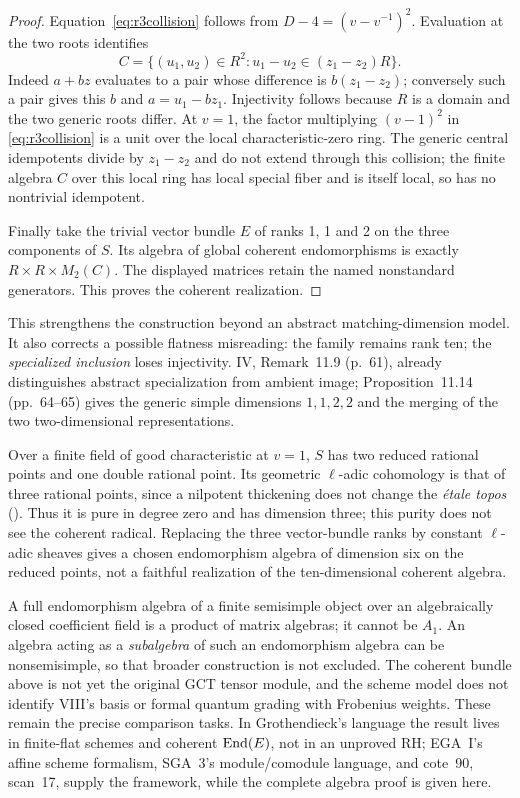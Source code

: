 \documentclass[11pt,a4paper]{article}
\theoremstyle{named}\newtheorem{finding}{Finding}[section]
\theoremstyle{definition}\newtheorem{definition}[finding]{Definition}
\theoremstyle{remark}\newtheorem{remark}[finding]{Remark}
\begin{document}
\begin{proof}
Equation~\eqref{eq:r3collision} follows from $D-4=(v-v^{-1})^2$. Evaluation at the two roots identifies
\[
 C=\{(u_1,u_2)\in R^2:u_1-u_2\in(z_1-z_2)R\}.
\]
Indeed $a+bz$ evaluates to a pair whose difference is $b(z_1-z_2)$; conversely such a pair gives this $b$ and $a=u_1-bz_1$. Injectivity follows because $R$ is a domain and the two generic roots differ. At $v=1$, the factor multiplying $(v-1)^2$ in \eqref{eq:r3collision} is a unit over the local characteristic-zero ring. The generic central idempotents divide by $z_1-z_2$ and do not extend through this collision; the finite algebra $C$ over this local ring has local special fiber and is itself local, so has no nontrivial idempotent.

Finally take the trivial vector bundle $E$ of ranks 1, 1 and 2 on the three components of $S$. Its algebra of global coherent endomorphisms is exactly $R\times R\times M_2(C)$. The displayed matrices retain the named nonstandard generators. This proves the coherent realization.
\end{proof}
This strengthens the construction beyond an abstract matching-dimension model. It also corrects a possible flatness misreading: the family remains rank ten; the \emph{specialized inclusion} loses injectivity. IV, Remark~11.9 (p.~61), already distinguishes abstract specialization from ambient image; Proposition~11.14 (pp.~64--65) gives the generic simple dimensions $1,1,2,2$ and the merging of the two two-dimensional representations.

Over a finite field of good characteristic at $v=1$, $S$ has two reduced rational points and one double rational point. Its geometric \(\ell\)-adic cohomology is that of three rational points, since a nilpotent thickening does not change the \emph{\'etale topos} (\cite[Proposition~59.45.4, tag~03SI]{StacksNil}). Thus it is pure in degree zero and has dimension three; this purity does not see the coherent radical. Replacing the three vector-bundle ranks by constant \(\ell\)-adic sheaves gives a chosen endomorphism algebra of dimension six on the reduced points, not a faithful realization of the ten-dimensional coherent algebra.

A full endomorphism algebra of a finite semisimple object over an algebraically closed coefficient field is a product of matrix algebras; it cannot be $A_1$. An algebra acting as a \emph{subalgebra} of such an endomorphism algebra can be nonsemisimple, so that broader construction is not excluded. The coherent bundle above is not yet the original GCT tensor module, and the scheme model does not identify VIII's basis or formal quantum grading with Frobenius weights. These remain the precise comparison tasks. In Grothendieck's language the result lives in finite-flat schemes and coherent $\operatorname{End}(E)$, not in an unproved RH; EGA~I's affine scheme formalism, SGA~3's module/comodule language, and cote~90, scan~17, supply the framework, while the complete algebra proof is given here.
\end{document}
